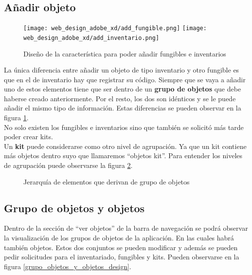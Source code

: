 \subsection{Añadir objeto}

\begin{figure}[ht]
    \begin{center}
        \texttt{[image: web\_design\_adobe\_xd/add\_fungible.png]}
        \texttt{[image: web\_design\_adobe\_xd/add\_inventario.png]}
        \caption{Diseño de la característica para poder añadir fungibles e inventarios}\label{adicion_inventario_fungible_design}
    \end{center}
\end{figure}

La única diferencia entre añadir un objeto de tipo inventario y otro fungible es que en el de inventario hay que registrar su código. Siempre que se vaya a añadir uno de estos elementos tiene que ser dentro de un \textbf{grupo de objetos} que debe haberse creado anteriormente. Por el resto, los dos son idénticos y se le puede añadir el mismo tipo de información. Estas diferencias se pueden observar en la figura \ref{adicion_inventario_fungible_design}.
\\No solo existen los fungibles e inventarios sino que también se solicitó más tarde poder crear kits.
\\Un \textbf{kit} puede considerarse como otro nivel de agrupación. Ya que un kit contiene más objetos dentro suyo que llamaremos ``objetos kit''. Para entender los niveles de agrupación puede observarse la figura \ref{jerarquia_grupo_objetos}.

\begin{figure}[ht]
    \caption{Jerarquía de elementos que derivan de grupo de objetos}\label{jerarquia_grupo_objetos}
\end{figure}

\subsection{Grupo de objetos y objetos}

Dentro de la sección de ``ver objetos'' de la barra de navegación se podrá observar la visualización de los grupos de objetos de la aplicación. En las cuales habrá también objetos. Estos dos conjuntos se pueden modificar y además se pueden pedir solicitudes para el inventariado, fungibles y kits. Pueden observarse en la figura \ref{grupo_objetos_y_objetos_design}.

